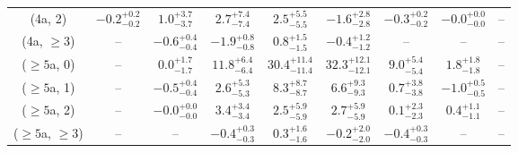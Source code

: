 \begin{table}[h!]
{\begin{tabular}{ccccccccc}
	(4a, 2) & $-0.2^{+ 0.2 }_{- 0.2 }$ & $1.0^{+ 3.7 }_{- 3.7 }$ & $2.7^{+ 7.4 }_{- 7.4 }$ & $2.5^{+ 5.5 }_{- 5.5 }$ & $-1.6^{+ 2.8 }_{- 2.8 }$ & $-0.3^{+ 0.2 }_{- 0.2 }$ & $-0.0^{+ 0.0 }_{- 0.0 }$ & -- \\[0.5ex] 
	(4a, $\ge3$) & -- & $-0.6^{+ 0.4 }_{- 0.4 }$ & $-1.9^{+ 0.8 }_{- 0.8 }$ & $0.8^{+ 1.5 }_{- 1.5 }$ & $-0.4^{+ 1.2 }_{- 1.2 }$ & -- & -- & -- \\[0.5ex] 
	($\ge5$a, 0) & -- & $0.0^{+ 1.7 }_{- 1.7 }$ & $11.8^{+ 6.4 }_{- 6.4 }$ & $30.4^{+ 11.4 }_{- 11.4 }$ & $32.3^{+ 12.1 }_{- 12.1 }$ & $9.0^{+ 5.4 }_{- 5.4 }$ & $1.8^{+ 1.8 }_{- 1.8 }$ & -- \\[0.5ex] 
	($\ge5$a, 1) & -- & $-0.5^{+ 0.4 }_{- 0.4 }$ & $2.6^{+ 5.3 }_{- 5.3 }$ & $8.3^{+ 8.7 }_{- 8.7 }$ & $6.6^{+ 9.3 }_{- 9.3 }$ & $0.7^{+ 3.8 }_{- 3.8 }$ & $-1.0^{+ 0.5 }_{- 0.5 }$ & -- \\[0.5ex] 
	($\ge5$a, 2) & -- & $-0.0^{+ 0.0 }_{- 0.0 }$ & $3.4^{+ 3.4 }_{- 3.4 }$ & $2.5^{+ 5.9 }_{- 5.9 }$ & $2.7^{+ 5.9 }_{- 5.9 }$ & $0.1^{+ 2.3 }_{- 2.3 }$ & $0.4^{+ 1.1 }_{- 1.1 }$ & -- \\[0.5ex] 
	($\ge5$a, $\ge3$) & -- & -- & $-0.4^{+ 0.3 }_{- 0.3 }$ & $0.3^{+ 1.6 }_{- 1.6 }$ & $-0.2^{+ 2.0 }_{- 2.0 }$ & $-0.4^{+ 0.3 }_{- 0.3 }$ & -- & -- \\[0.5ex] 
	\hline
	\hline
\end{tabular}}
\end{table}
